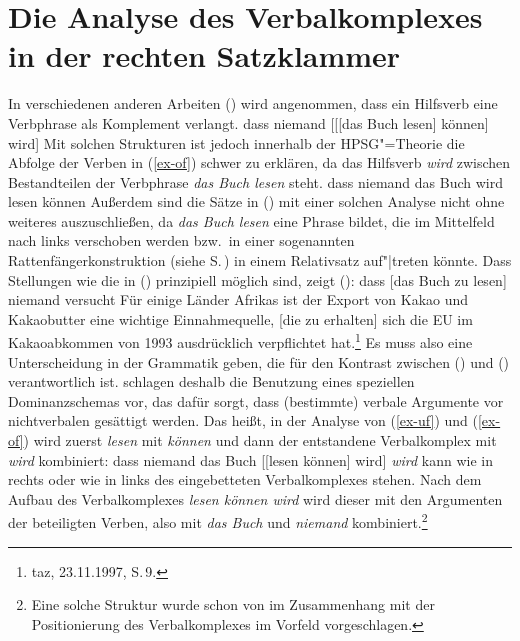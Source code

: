 \section{Die Analyse des Verbalkomplexes in der rechten Satzklammer}
\label{sec-verbalkomplex}

In verschiedenen anderen Arbeiten (\zb {}) 
wird angenommen, dass ein Hilfsverb eine Verbphrase als Komplement verlangt. 
\ea
\label{ex-uf}
dass niemand [[[das Buch lesen] können] wird]
\z
Mit solchen Strukturen ist jedoch innerhalb der HPSG"=Theorie
die Abfolge der Verben in (\ref{ex-of}) schwer zu erklären,
da das Hilfsverb \emph{wird} zwischen Bestandteilen der Verbphrase \emph{das Buch lesen} steht.
\ea
\label{ex-of}
dass niemand das Buch wird lesen können
\z
Außerdem sind die Sätze in () mit einer solchen Analyse nicht ohne weiteres auszuschließen,
da \emph{das Buch lesen} eine Phrase bildet, die im Mittelfeld nach links verschoben
werden bzw.\ in einer sogenannten Rattenfängerkonstruktion (siehe S.\,\pageref{page-rattenfaenger})
in einem Relativsatz auf"|treten könnte.
\eal
{}
\zl
Dass Stellungen wie die in () prinzipiell möglich sind, zeigt ():
\eal
\ex dass [das Buch zu lesen] niemand versucht
\ex Für einige Länder Afrikas ist der Export von Kakao und Kakaobutter eine wichtige
Einnahmequelle, [die zu erhalten] sich die EU im Kakaoabkommen von 1993 ausdrücklich
verpflichtet hat.\footnote{
        taz, 23.11.1997, S.\,9.
}
\zl
Es muss also eine Unterscheidung in der Grammatik geben, die für den Kontrast
zwischen () und () verantwortlich ist.
\citet*{HN94a} 
schlagen deshalb die Benutzung eines speziellen Dominanzschemas vor, 
das dafür sorgt, dass (bestimmte) verbale Argumente vor nichtverbalen gesättigt werden. Das heißt,
in der Analyse von (\ref{ex-uf}) und (\ref{ex-of}) wird zuerst \emph{lesen} mit \emph{können}
und dann der entstandene Verbalkomplex mit \emph{wird} kombiniert:
\ea
\label{ex-struktur-lesen-koennen-wird}
dass niemand das Buch [[lesen können] wird]
\z
\emph{wird} kann wie in  rechts oder wie in  links des eingebetteten Verbalkomplexes
stehen. Nach dem Aufbau des Verbalkomplexes \emph{lesen können wird} wird dieser mit den Argumenten 
der beteiligten Verben, also mit \emph{das Buch} und \emph{niemand} kombiniert.\footnote{
        Eine solche Struktur wurde schon von 
        \citet*{Johnson86a}
        im Zusammenhang mit der Positionierung des Verbalkomplexes im
        Vorfeld vorgeschlagen.
}


